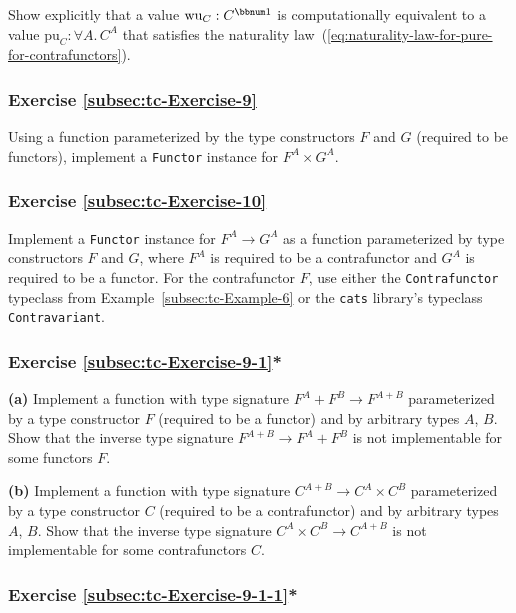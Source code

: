 Show explicitly that a value $\text{wu}_{C}:C^{\bbnum 1}$ is computationally
equivalent to a value $\text{pu}_{C}:\forall A.\,C^{A}$ that satisfies
the naturality law~(\ref{eq:naturality-law-for-pure-for-contrafunctors}).

\subsubsection{Exercise \label{subsec:tc-Exercise-9}\ref{subsec:tc-Exercise-9}}

Using a function parameterized by the type constructors $F$ and $G$
(required to be functors), implement a \lstinline!Functor! instance
for $F^{A}\times G^{A}$. 

\subsubsection{Exercise \label{subsec:tc-Exercise-10}\ref{subsec:tc-Exercise-10}}

Implement a \lstinline!Functor! instance for $F^{A}\rightarrow G^{A}$
as a function parameterized by type constructors $F$ and $G$, where
$F^{A}$ is required to be a contrafunctor and $G^{A}$ is required
to be a functor. For the contrafunctor $F$, use either the \lstinline!Contrafunctor!
typeclass from Example~\ref{subsec:tc-Example-6} or the \texttt{cats}
library\textsf{'}s typeclass \lstinline!Contravariant!.

\subsubsection{Exercise \label{subsec:tc-Exercise-9-1}\ref{subsec:tc-Exercise-9-1}{*}}

\textbf{(a)} Implement a function with type signature $F^{A}+F^{B}\rightarrow F^{A+B}$
parameterized by a type constructor $F$ (required to be a functor)
and by arbitrary types $A$, $B$. Show that the inverse type signature
$F^{A+B}\rightarrow F^{A}+F^{B}$ is not implementable for some functors
$F$. 

\textbf{(b)} Implement a function with type signature $C^{A+B}\rightarrow C^{A}\times C^{B}$
parameterized by a type constructor $C$ (required to be a contrafunctor)
and by arbitrary types $A$, $B$. Show that the inverse type signature
$C^{A}\times C^{B}\rightarrow C^{A+B}$ is not implementable for some
contrafunctors $C$.

\subsubsection{Exercise \label{subsec:tc-Exercise-9-1-1}\ref{subsec:tc-Exercise-9-1-1}{*}}

